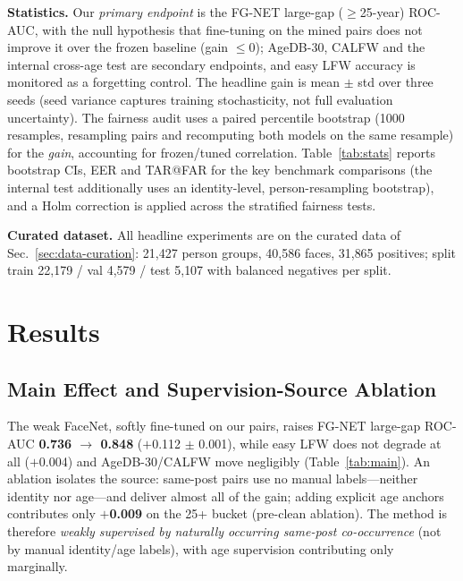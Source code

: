 \documentclass[journal]{IEEEtran}
\begin{document}
\textbf{Statistics.} Our \emph{primary endpoint} is the FG-NET large-gap ($\geq$25-year) ROC-AUC, with the null hypothesis that fine-tuning on the mined pairs does not improve it over the frozen baseline (gain $\leq 0$); AgeDB-30, CALFW and the internal cross-age test are secondary endpoints, and easy LFW accuracy is monitored as a forgetting control. The headline gain is mean $\pm$ std over three seeds (seed variance captures training stochasticity, not full evaluation uncertainty). The fairness audit uses a paired percentile bootstrap (1000 resamples, resampling pairs and recomputing both models on the same resample) for the \emph{gain}, accounting for frozen/tuned correlation. Table~\ref{tab:stats} reports bootstrap CIs, EER and TAR@FAR for the key benchmark comparisons (the internal test additionally uses an identity-level, person-resampling bootstrap), and a Holm correction is applied across the stratified fairness tests.

\textbf{Curated dataset.} All headline experiments are on the curated data of Sec.~\ref{sec:data-curation}: 21{,}427 person groups, 40{,}586 faces, 31{,}865 positives; split train 22{,}179 / val 4{,}579 / test 5{,}107 with balanced negatives per split.

\section{Results}\label{sec:results}
\subsection{Main Effect and Supervision-Source Ablation}\label{sec:res-main}
The weak FaceNet, softly fine-tuned on our pairs, raises FG-NET large-gap ROC-AUC \textbf{0.736 $\rightarrow$ 0.848} ($+$0.112 $\pm$ 0.001), while easy LFW does not degrade at all ($+$0.004) and AgeDB-30/CALFW move negligibly (Table~\ref{tab:main}). An ablation isolates the source: same-post pairs use no manual labels---neither identity nor age---and deliver almost all of the gain; adding explicit age anchors contributes only \textbf{$+$0.009} on the 25+ bucket (pre-clean ablation). The method is therefore \emph{weakly supervised by naturally occurring same-post co-occurrence} (not by manual identity/age labels), with age supervision contributing only marginally.
\end{document}
